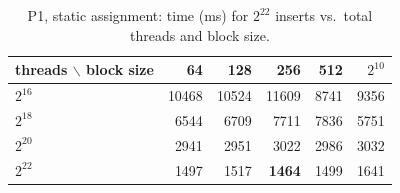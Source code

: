 \begin{table}[H]\centering\small
\caption{P1, static assignment: time (ms) for $2^{22}$ inserts vs.\ total threads and block size.}\label{tab:p1static}
\begin{tabular}{lrrrrr}
\toprule
threads $\backslash$ block size & 64 & 128 & 256 & 512 & $2^{10}$ \\
\midrule
$2^{16}$ & 10468 & 10524 & 11609 & 8741 & 9356 \\
$2^{18}$ & 6544 & 6709 & 7711 & 7836 & 5751 \\
$2^{20}$ & 2941 & 2951 & 3022 & 2986 & 3032 \\
$2^{22}$ & 1497 & 1517 & \textbf{1464} & 1499 & 1641 \\
\bottomrule
\end{tabular}
\end{table}
